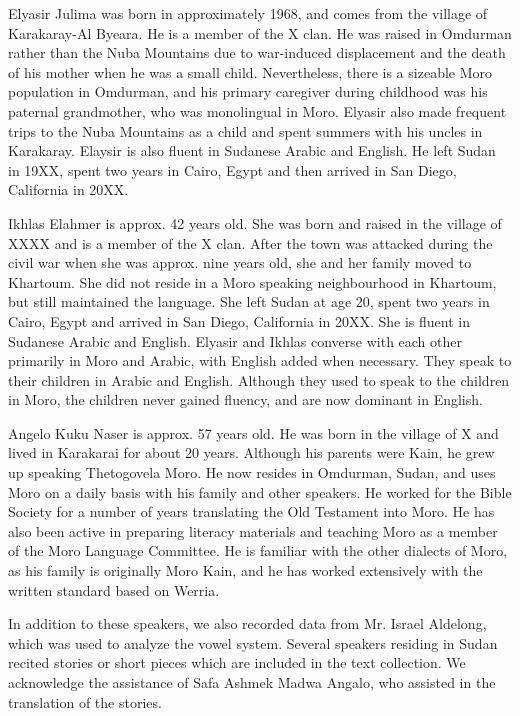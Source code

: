 Elyasir Julima was born in approximately 1968, and comes from the village of Karakaray-Al Byeara. He is a member of the X clan. He was raised in Omdurman rather than the Nuba Mountains due to war-induced displacement and the death of his mother when he was a small child. Nevertheless, there is a sizeable Moro population in Omdurman, and his primary caregiver during childhood was his paternal grandmother, who was monolingual in Moro. Elyasir also made frequent trips to the Nuba Mountains as a child and spent summers with his uncles in Karakaray. Elaysir is also fluent in Sudanese Arabic and English. He left Sudan in 19XX, spent two years in Cairo, Egypt and then arrived in San Diego, California in 20XX. 


Ikhlas Elahmer is approx. 42 years old. She was born and raised in the village of XXXX and is a member of the X clan. After the town was attacked during the civil war when she was approx. nine years old, she and her family moved to Khartoum. She did not reside in a Moro speaking neighbourhood in Khartoum, but still maintained the language. She left Sudan at age 20, spent two years in Cairo, Egypt and arrived in San Diego, California in 20XX. She is fluent in Sudanese Arabic and English. Elyasir and Ikhlas converse with each other primarily in Moro and Arabic, with English added when necessary. They speak to their children in Arabic and English. Although they used to speak to the children in Moro, the children never gained fluency, and are now dominant in English. 

Angelo Kuku Naser is approx. 57 years old. He was born in the village of X and lived in Karakarai for about 20 years. Although his parents were Kain, he grew up speaking Thetogovela Moro. He now resides in Omdurman, Sudan, and uses Moro on a daily basis with his family and other speakers. He worked for the Bible Society for a number of years translating the Old Testament into Moro. He has also been active in preparing literacy materials and teaching Moro as a member of the Moro Language Committee. He is familiar with the other dialects of Moro, as his family is originally Moro Kain, and he has worked extensively with the written standard based on Werria. 

In addition to these speakers, we also recorded data from Mr. Israel Aldelong, which was used to analyze the vowel system. Several speakers residing in Sudan recited stories or short pieces which are included in the text collection. We  acknowledge the assistance of Safa Ashmek Madwa Angalo, who assisted in the translation of the stories. 

